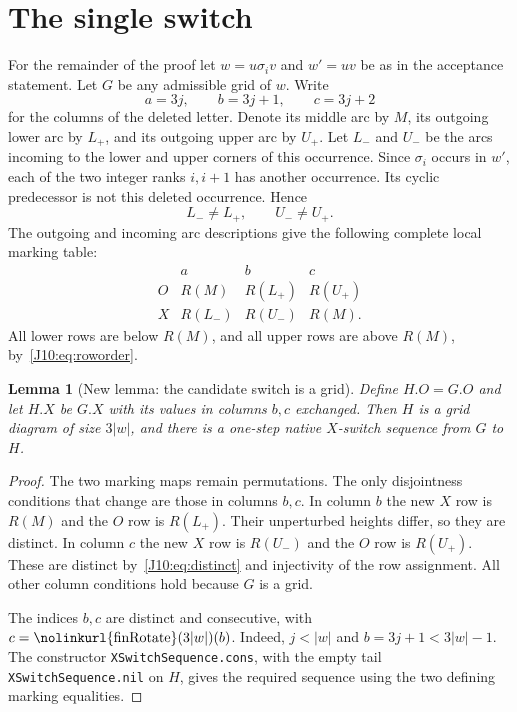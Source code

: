 \documentclass[11pt,oneside]{report}
\newtheorem{lemma}[theorem]{Lemma}
\theoremstyle{definition}
\numberwithin{equation}{section}
\newcommand{\decl}[1]{\textnormal{\nolinkurl{#1}}}
\begin{document}
\section{The single switch}

For the remainder of the proof let $w=u\sigma_i v$ and $w'=uv$ be as
in the acceptance statement. Let $G$ be any admissible grid of $w$.
Write
\[
 a=3j,\qquad b=3j+1,\qquad c=3j+2
\]
for the columns of the deleted letter.
Denote its middle arc by $M$, its outgoing lower arc by $L_+$,
and its outgoing upper arc by $U_+$.
Let $L_-$ and $U_-$ be the arcs incoming to the lower and upper corners
of this occurrence. Since $\sigma_i$ occurs in $w'$, each of the
two integer ranks $i,i+1$ has another occurrence. Its cyclic
predecessor is not this deleted occurrence. Hence
\begin{equation}\label{J10:eq:distinct}
 L_-\ne L_+,\qquad U_-\ne U_+.
\end{equation}
The outgoing and incoming arc descriptions give the following complete
local marking table:
\begin{equation}\label{J10:eq:initial}
\begin{array}{c|ccc}
 &a&b&c\\ \hline
 O&R(M)&R(L_+)&R(U_+)\\
 X&R(L_-)&R(U_-)&R(M).
\end{array}
\end{equation}
All lower rows are below $R(M)$, and all upper rows are above $R(M)$,
by~\eqref{J10:eq:roworder}.

\begin{lemma}[New lemma: the candidate switch is a grid]
\label{J10:lem:switch}
Define $H.O=G.O$ and let $H.X$ be $G.X$ with its values in columns
$b,c$ exchanged. Then $H$ is a grid diagram of size $3|w|$, and there
is a one-step native $X$-switch sequence from $G$ to $H$.
\end{lemma}

\begin{proof}
The two marking maps remain permutations. The only disjointness
conditions that change are those in columns $b,c$.
In column $b$ the new $X$ row is $R(M)$ and the $O$ row is $R(L_+)$.
Their unperturbed heights differ, so they are distinct.
In column $c$ the new $X$ row is $R(U_-)$ and the $O$ row is $R(U_+)$.
These are distinct by~\eqref{J10:eq:distinct} and injectivity of the row
assignment. All other column conditions hold because $G$ is a grid.

The indices $b,c$ are distinct and consecutive, with
$c=\decl{finRotate}(3|w|)(b)$. Indeed, $j<|w|$ and
$b=3j+1<3|w|-1$. The constructor \decl{XSwitchSequence.cons},
with the empty tail \decl{XSwitchSequence.nil} on $H$, gives the
required sequence using the two defining marking equalities.
\end{proof}
\end{document}
